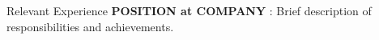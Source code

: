 \begin{rubric}{Relevant Experience}
%
%
	\normalsize\textbf{POSITION at COMPANY} : Brief description of responsibilities and achievements.
%
%
\end{rubric}